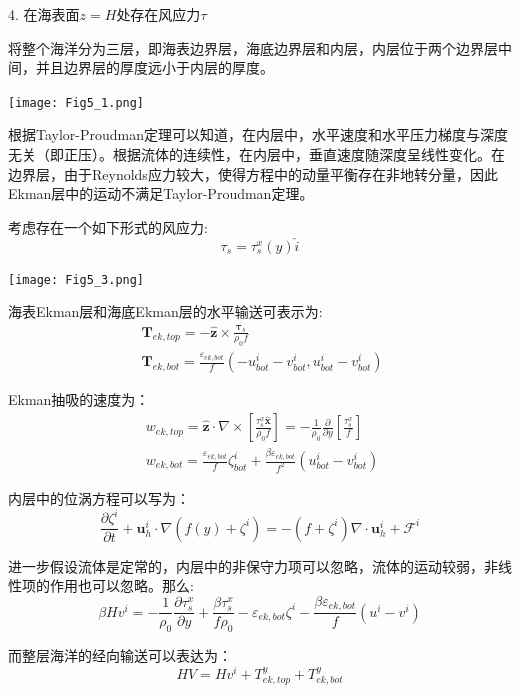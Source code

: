 \documentclass{article}
\begin{document}
4. 在海表面$z=H$处存在风应力$\tau$

将整个海洋分为三层，即海表边界层，海底边界层和内层，内层位于两个边界层中间，并且边界层的厚度远小于内层的厚度。
\begin{center}
    \texttt{[image: Fig5\_1.png]}
\end{center}

根据Taylor-Proudman定理可以知道，在内层中，水平速度和水平压力梯度与深度无关（即正压）。根据流体的连续性，在内层中，垂直速度随深度呈线性变化。在边界层，由于Reynolds应力较大，使得方程中的动量平衡存在非地转分量，因此Ekman层中的运动不满足Taylor-Proudman定理。

考虑存在一个如下形式的风应力:
$$\tau_s = \tau_s^x(y) \hat{i}$$
\begin{center}
    \texttt{[image: Fig5\_3.png]}
\end{center}

海表Ekman层和海底Ekman层的水平输送可表示为:
\begin{align}
  & {{\mathbf{T}}_{ek,top}}=-\mathbf{\hat{z}}\times \frac{{{\mathbf{\tau }}_{s}}}{{{\rho }_{0}}f} \\ 
 & {{\mathbf{T}}_{ek,bot}}=\frac{{{\varepsilon }_{ek,bot}}}{f}(-u_{bot}^{i}-v_{bot}^{i},u_{bot}^{i}-v_{bot}^{i})\ \  
\end{align}

Ekman抽吸的速度为：
\begin{align}
  & {{w}_{ek,top}}=\mathbf{\hat{z}}\cdot \nabla \times \left[ \frac{\tau _{s}^{x}\mathbf{\hat{x}}}{{{\rho }_{0}}f} \right]=-\frac{1}{{{\rho }_{0}}}\frac{\partial }{\partial y}\left[ \frac{\tau _{s}^{x}}{f} \right] \\ 
 & {{w}_{ek,bot}}=\frac{{{\varepsilon }_{ek,bot}}}{f}\zeta _{bot}^{i}+\frac{\beta {{\varepsilon }_{ek,bot}}}{{{f}^{2}}}\left( u_{bot}^{i}-v_{bot}^{i} \right)\ \  
\end{align}

内层中的位涡方程可以写为：
$$\frac{\partial {{\zeta }^{i}}}{\partial t}+\mathbf{u}_{h}^{i}\cdot \nabla \left( f(y)+{{\zeta }^{i}} \right)=-\left( f+{{\zeta }^{i}} \right)\nabla \cdot \mathbf{u}_{h}^{i}+{{\mathcal{F}}^{i}}$$

进一步假设流体是定常的，内层中的非保守力项可以忽略，流体的运动较弱，非线性项的作用也可以忽略。那么:
$$\beta H{{v}^{i}}=-\frac{1}{{{\rho }_{0}}}\frac{\partial \tau _{s}^{x}}{\partial y}+\frac{\beta \tau _{s}^{x}}{f{{\rho }_{0}}}-{{\varepsilon }_{ek,bot}}{{\zeta }^{i}}-\frac{\beta {{\varepsilon }_{ek,bot}}}{f}({{u}^{i}}-{{v}^{i}})$$

而整层海洋的经向输送可以表达为：
$$HV=H{{v}^{i}}+T_{ek,top}^{y}+T_{ek,bot}^{y}$$
\end{document}
